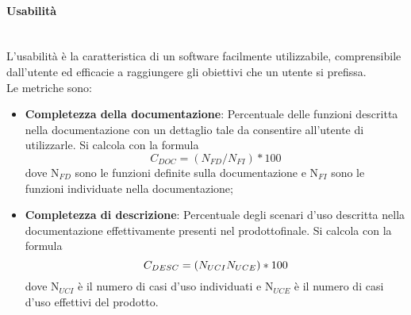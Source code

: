 	\paragraph{Usabilità} \mbox{}\\
	L'usabilità è la caratteristica di un software facilmente utilizzabile, comprensibile dall'utente ed efficacie a raggiungere gli obiettivi che un utente si prefissa.\\
	Le metriche sono:
	\begin{itemize}
		\item \textbf{Completezza della documentazione}: Percentuale delle funzioni descritta nella documentazione con un dettaglio tale da consentire all'utente di utilizzarle. Si calcola con la formula
		\[C_{DOC}=(N_{FD}/N_{FI})*100\]
		dove N$_{FD}$ sono le funzioni definite sulla documentazione e N$_{FI}$ sono le funzioni individuate nella documentazione;
		\item \textbf{Completezza di descrizione}: Percentuale degli scenari d’uso descritta nella documentazione effettivamente presenti nel prodotto\glosp finale. Si calcola con la formula
		\[C_{DESC}=(N_{UCI}\\N_{UCE})*100\]
		dove N$_{UCI}$ è il numero di casi d'uso individuati e N$_{UCE}$ è il numero di casi d'uso effettivi del prodotto\glo.
	\end{itemize}

